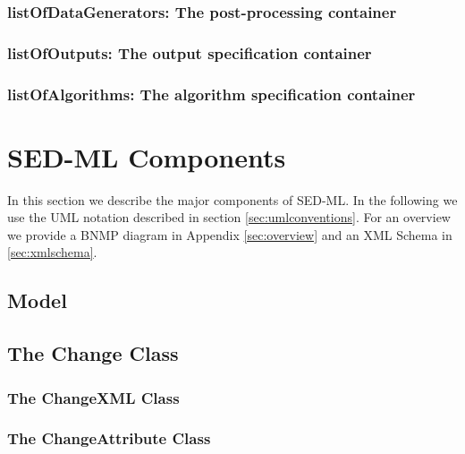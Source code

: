  \subsubsection{listOfDataGenerators: The post-processing container}
 

 \subsubsection{listOfOutputs: The output specification container}
 

 \subsubsection{listOfAlgorithms: The algorithm specification container}
 



\section{SED-ML Components}
In this section we describe the major components of SED-ML. In the following we 
use the UML notation described in section \ref{sec:umlconventions}. For an overview we 
provide a BNMP diagram in Appendix \ref{sec:overview} and an XML Schema in 
\ref{sec:xmlschema}. 

  \subsection{Model}
  

  \subsection[Change]{The Change Class}
  

  \subsubsection[ChangeXML]{The ChangeXML Class}
  

  \subsubsection[ChangeAttribute]{The ChangeAttribute Class}
  

